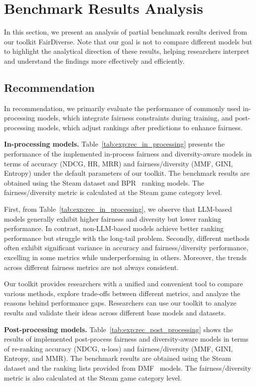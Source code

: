 \section{Benchmark Results Analysis}
In this section, we present an analysis of partial benchmark results derived from our toolkit FairDiverse. Note that our goal is not to compare different models but to highlight the analytical direction of these results, helping researchers interpret and understand the findings more effectively and efficiently.

\subsection{Recommendation} 

In recommendation, we primarily evaluate the performance of commonly used in-processing models, which integrate fairness constraints during training, and post-processing models, which adjust rankings after predictions to enhance fairness.

\noindent\textbf{In-processing models.}
Table~\ref{tab:exp:rec_in_processing} presents the performance of the implemented in-process fairness and diversity-aware models in terms of accuracy (NDCG, HR, MRR) and fairness/diversity (MMF, GINI, Entropy) under the default parameters of our toolkit. The benchmark results are obtained using the Steam dataset and BPR~\cite{BPR} ranking models. The fairness/diversity metric is calculated at the Steam game category level.

First, from Table~\ref{tab:exp:rec_in_processing}, we observe that LLM-based models generally exhibit higher fairness and diversity but lower ranking performance. In contrast, non-LLM-based models achieve better ranking performance but struggle with the long-tail problem. 
Secondly, different methods often exhibit significant variance in accuracy and fairness/diversity performance, excelling in some metrics while underperforming in others. Moreover, the trends across different fairness metrics are not always consistent. 

Our toolkit provides researchers with a unified and convenient tool to compare various methods, explore trade-offs between different metrics, and analyze the reasons behind performance gaps. Researchers can use our toolkit to analyze results and validate their ideas across different base models and datasets.

\noindent\textbf{Post-processing models.} Table~\ref{tab:exp:rec_post_processing} shows the results of implemented post-process fairness and diversity-aware models in terms of re-ranking accuracy (NDCG, u-loss) and fairness/diversity (MMF, GINI, Entropy, and MMR). The benchmark results are obtained using the Steam dataset and the ranking lists provided from DMF~\cite{DMF} models. The fairness/diversity metric is also calculated at the Steam game category level.

